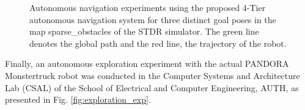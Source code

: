 \documentclass[conference]{IEEEtran}
\begin{document}
\begin{figure}[!ht]
  \centering
  \caption{Autonomous navigation experiments using the proposed 4-Tier autonomous navigation system for three distinct goal poses in the map sparse\_obstacles of the STDR simulator. The green line denotes the global path and the red line, the trajectory of the robot.}
  \label{fig:rsband_exp}
\end{figure}

Finally, an autonomous exploration experiment with the actual PANDORA Monstertruck robot was conducted in the Computer Systems and Architecture Lab (CSAL) of the School of Electrical and Computer Engineering, AUTH, as presented in Fig. \ref{fig:exploration_exp}.
\end{document}
